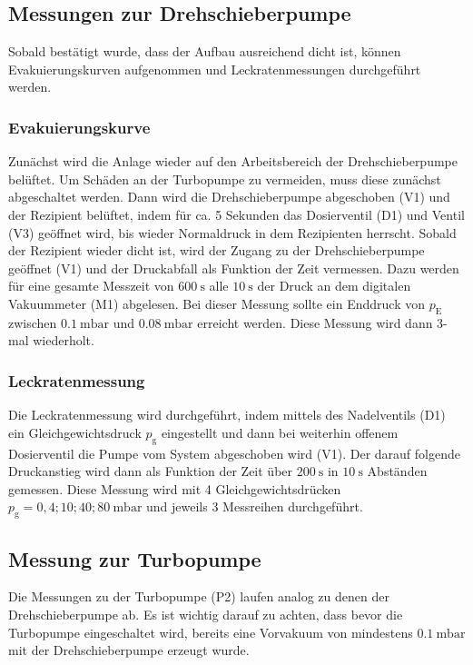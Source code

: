 	\subsection{Messungen zur Drehschieberpumpe}

		Sobald bestätigt wurde, dass der Aufbau ausreichend dicht ist, können Evakuierungskurven aufgenommen und Leckratenmessungen durchgeführt werden.

		\subsubsection{Evakuierungskurve}

			Zunächst wird die Anlage wieder auf den Arbeitsbereich der Drehschieberpumpe belüftet. 
			Um Schäden an der Turbopumpe zu vermeiden, muss diese zunächst abgeschaltet werden. 
			Dann wird die Drehschieberpumpe abgeschoben (V1) und der Rezipient belüftet, 
			indem für ca. 5 Sekunden das Dosierventil (D1) und Ventil (V3) geöffnet wird, 
			bis wieder Normaldruck in dem Rezipienten herrscht. 
			Sobald der Rezipient wieder dicht ist, wird der Zugang zu der Drehschieberpumpe geöffnet (V1) und der Druckabfall als Funktion der Zeit vermessen. 
			Dazu werden für eine gesamte Messzeit von $\SI{600}{\second}$ alle $\SI{10}{\second}$ der Druck an dem digitalen Vakuummeter (M1) abgelesen.
			Bei dieser Messung sollte ein Enddruck von $p_\text{E}$ zwischen $\SI{0.1}{\milli\bar}$ und $\SI{0.08}{\milli\bar}$ erreicht werden.
			Diese Messung wird dann 3-mal wiederholt.

		\subsubsection{Leckratenmessung}

		 	Die Leckratenmessung wird durchgeführt, indem mittels des Nadelventils (D1) ein Gleichgewichtsdruck $p_\text{g}$ eingestellt und dann bei weiterhin offenem Dosierventil die Pumpe vom System abgeschoben wird (V1).
			Der darauf folgende Druckanstieg wird dann als Funktion der Zeit über $\SI{200}{\second}$ in $\SI{10}{\second}$ Abständen gemessen. 
			Diese Messung wird mit 4 Gleichgewichtsdrücken $p_\text{g} = 0,4; 10; 40; \SI{80}{\milli\bar}$ und jeweils 3 Messreihen durchgeführt.

	\subsection{Messung zur Turbopumpe}

		Die Messungen zu der Turbopumpe (P2) laufen analog zu denen der Drehschieberpumpe ab. 
		Es ist wichtig darauf zu achten, dass bevor die Turbopumpe eingeschaltet wird,
	    bereits eine Vorvakuum von mindestens $\SI{0.1}{\milli\bar}$ mit der Drehschieberpumpe erzeugt wurde.
		
